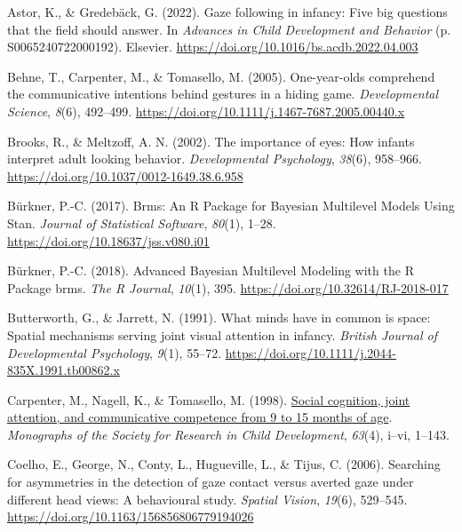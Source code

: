 \documentclass[
  man,floatsintext]{apa6}
\newlength{\cslhangindent}
\newlength{\cslentryspacingunit} %
\newenvironment{CSLReferences}[2] %
 {%
  \setlength{\parindent}{0pt}
  \ifodd #1
  \let\oldpar\par
  \def\par{\hangindent=\cslhangindent\oldpar}
  \fi
  \setlength{\parskip}{#2\cslentryspacingunit}
 }%
 {}
\begin{document}
\hypertarget{refs}{}
\begin{CSLReferences}{1}{0}
\leavevmode{}%
Astor, K., \& Gredebäck, G. (2022). Gaze following in infancy: {Five} big questions that the field should answer. In \emph{Advances in {Child Development} and {Behavior}} (p. S0065240722000192). {Elsevier}. \url{https://doi.org/10.1016/bs.acdb.2022.04.003}

\leavevmode{}%
Behne, T., Carpenter, M., \& Tomasello, M. (2005). One-year-olds comprehend the communicative intentions behind gestures in a hiding game. \emph{Developmental Science}, \emph{8}(6), 492--499. \url{https://doi.org/10.1111/j.1467-7687.2005.00440.x}

\leavevmode{}%
Brooks, R., \& Meltzoff, A. N. (2002). The importance of eyes: {How} infants interpret adult looking behavior. \emph{Developmental Psychology}, \emph{38}(6), 958--966. \url{https://doi.org/10.1037/0012-1649.38.6.958}

\leavevmode{}%
Bürkner, P.-C. (2017). Brms: {An R Package} for {Bayesian Multilevel Models Using Stan}. \emph{Journal of Statistical Software}, \emph{80}(1), 1--28. \url{https://doi.org/10.18637/jss.v080.i01}

\leavevmode{}%
Bürkner, P.-C. (2018). Advanced {Bayesian Multilevel Modeling} with the {R Package} brms. \emph{The R Journal}, \emph{10}(1), 395. \url{https://doi.org/10.32614/RJ-2018-017}

\leavevmode{}%
Butterworth, G., \& Jarrett, N. (1991). What minds have in common is space: {Spatial} mechanisms serving joint visual attention in infancy. \emph{British Journal of Developmental Psychology}, \emph{9}(1), 55--72. \url{https://doi.org/10.1111/j.2044-835X.1991.tb00862.x}

\leavevmode{}%
Carpenter, M., Nagell, K., \& Tomasello, M. (1998). \href{https://www.ncbi.nlm.nih.gov/pubmed/9835078}{Social cognition, joint attention, and communicative competence from 9 to 15 months of age}. \emph{Monographs of the Society for Research in Child Development}, \emph{63}(4), i--vi, 1--143.

\leavevmode{}%
Coelho, E., George, N., Conty, L., Hugueville, L., \& Tijus, C. (2006). Searching for asymmetries in the detection of gaze contact versus averted gaze under different head views: A behavioural study. \emph{Spatial Vision}, \emph{19}(6), 529--545. \url{https://doi.org/10.1163/156856806779194026}


\end{CSLReferences}
\end{document}
